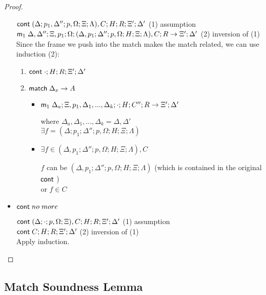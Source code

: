 \begin{proof}
\begin{itemize}
   $\mathsf{cont} \; (\Delta; p_1, \Delta''; p, \Omega; \Xi; \Lambda), C; H; R; \Xi'; \Delta'$ \hfill (1) assumption \\
   $\mathsf{m}_1 \; \Delta, \Delta''; \Xi, p_1;  \Omega; (\Delta, p_1; \Delta''; p, \Omega; H; \Xi; \Lambda), C; R \rightarrow \Xi'; \Delta'$ \hfill (2) inversion of (1)\\
   Since the frame we push into the match makes the match related, we can use induction (2):
   
   \begin{enumerate}
      \item $\mathsf{cont} \; \cdot; H; R; \Xi'; \Delta'$
      
      \item $\mathsf{match} \; \Delta_x \rightarrow A$
      \begin{itemize}
         \item $\mathsf{m}_1 \; \Delta_a; \Xi, p_1, \Delta_1, ..., \Delta_k; \cdot; H; C''; R \rightarrow \Xi'; \Delta'$ 
      
         where $\Delta_a, \Delta_1, ..., \Delta_k = \Delta, \Delta'$ \\
      
         $\exists f = (\Delta; p_1; \Delta''; p, \Omega; H; \Xi; \Lambda)$
      
         \item $\exists f \in (\Delta, p_1; \Delta''; p, \Omega; H; \Xi; \Lambda), C$
      
         $f$ can be $(\Delta, p_1; \Delta''; p, \Omega; H; \Xi; \Lambda)$ (which is contained in the original $\mathsf{cont} \;$)\\
         or $f \in C$\\
      \end{itemize}
   \end{enumerate}
   
   \item $\mathsf{cont} \; no \; more$
   
   $\mathsf{cont} \; (\Delta; \cdot; p, \Omega; \Xi), C; H; R; \Xi'; \Delta'$ \hfill (1) assumption \\
   $\mathsf{cont} \; C; H; R; \Xi'; \Delta'$ \hfill (2) inversion of (1) \\
   
   Apply induction.
\end{itemize}

\end{proof}

\subsection{Match Soundness Lemma}

